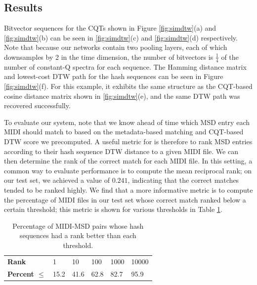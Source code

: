 \documentclass{article}
\begin{document}
\subsection{Results}

Bitvector sequences for the CQTs shown in Figure \ref{fig:simdtw}(a) and \ref{fig:simdtw}(b) can be seen in \ref{fig:simdtw}(c) and \ref{fig:simdtw}(d) respectively.
Note that because our networks contain two pooling layers, each of which downsamples by 2 in the time dimension, the number of bitvectors is $\frac{1}{4}$ of the number of constant-Q spectra for each sequence.
The Hamming distance matrix and lowest-cost DTW path for the hash sequences can be seen in Figure \ref{fig:simdtw}(f). 
For this example, it exhibits the same structure as the CQT-based cosine distance matrix shown in \ref{fig:simdtw}(e), and the same DTW path was recovered successfully.

To evaluate our system, note that we know ahead of time which MSD entry each MIDI should match to based on the metadata-based matching and CQT-based DTW score we precomputed.
A useful metric for is therefore to rank MSD entries according to their hash sequence DTW distance to a given MIDI file.
We can then determine the rank of the correct match for each MIDI file.
In this setting, a common way to evaluate performance is to compute the mean reciprocal rank; on our test set, we achieved a value of \textbf{$0.241$}, indicating that the correct matches tended to be ranked highly.
We find that a more informative metric is to compute the percentage of MIDI files in our test set whose correct match ranked below a certain threshold; this metric is shown for various thresholds in Table \ref{tab:rank-percentages}.

\begin{table}
  \begin{center}
    \begin{tabular}{@{}llllll@{}}
      \toprule
      \textbf{Rank} & 1 & 10 & 100 & 1000 & 10000 \\
      \textbf{Percent $\le$} & 15.2 & 41.6 & 62.8 & 82.7 & 95.9 \\
      \bottomrule
    \end{tabular}
  \end{center}
  \caption{Percentage of MIDI-MSD pairs whose hash sequences had a rank better than each threshold.}
  \label{tab:rank-percentages}
\end{table}
\end{document}
